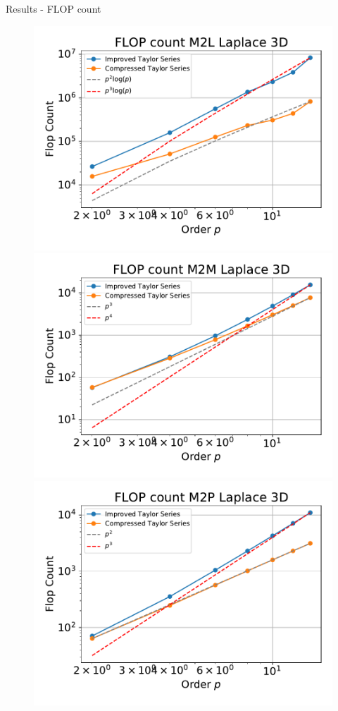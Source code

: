 \documentclass[10pt,usenames,dvipsnames]{beamer}
\begin{document}
\begin{frame}[fragile]{Results - FLOP count}
\begin{figure}
\includegraphics[scale=0.3]{figures/flops-laplace-M2L-3d.pdf}
\includegraphics[scale=0.3]{figures/flops-laplace-M2M-3d.pdf}
\includegraphics[scale=0.3]{figures/flops-laplace-M2P-3d.pdf}

\end{figure}
\end{frame}
\end{document}
